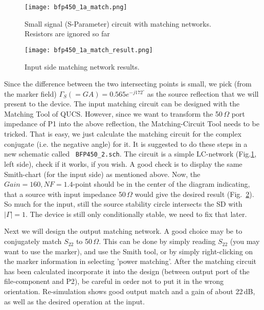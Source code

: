 \begin{figure}
  \centering
  {\texttt{[image: bfp450\_1a\_match.png]}}
  \caption{Small signal (S-Parameter) circuit with matching
    networks. Resistors are ignored so far}
  \label{fig:bfp450_1a_match}
\end{figure}

\begin{figure}
  \centering
  {\texttt{[image: bfp450\_1a\_match\_result.png]}}
  \caption{Input side matching network results.}
  \label{fig:bfp450_1a_match_result}
\end{figure}


Since the difference between the two intersecting points is small, we
pick (from the marker field) $\Gamma_S(=GA)=0.565e^{-j172^\circ}$ as
the source reflection that we will present to the device. The input
matching circuit can be designed with the Matching Tool of
QUCS. However, since we want to transform the 50\,$\Omega$ port
impedance of P1 into the above reflection, the Matching-Circuit Tool
needs to be tricked. That is easy, we just calculate the matching
circuit for the complex conjugate (i.e. the negative angle) for it. It
is suggested to do these steps in a new schematic called \texttt{
  BFP450\_2.sch}. The circuit is a simple LC-network
(Fig.\ref{fig:bfp450_1a_match}, left side), check if it works, if you
wish. A good check is to display the same Smith-chart (for the input
side) as mentioned above. Now, the $Gain=160,NF=1.4$-point should be
in the center of the diagram indicating, that a source with input
impedance 50\,$\Omega$ would give the desired result
(Fig.~\ref{fig:bfp450_1a_match_result}). So much for the input, still
the source stability circle intersects the SD with $|\Gamma|=1$. The
device is still only conditionally stable, we need to fix that later.

Next we will design the output matching network. A good choice may be
to conjugately match $S_{22}$ to 50\,$\Omega$. This can be done by
simply reading $S_{22}$ (you may want to use the marker), and use the
Smith tool, or by simply right-clicking on the marker information in
selecting 'power matching'. After the matching circuit has been
calculated incorporate it into the design (between output port of the
file-component and P2), be careful in order not to put it in the
wrong orientation. Re-simulation shows good output match and a gain of
about 22\,dB, as well as the desired operation at the input. 


